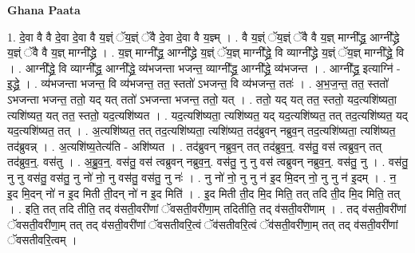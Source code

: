 \documentclass[17pt]{extarticle}
\begin{document}
\textbf{Ghana Paata } \newline

1. दे॒वा वै वै दे॒वा दे॒वा वै य॒ज्ञ्ं ॅय॒ज्ञ्ं ॅवै दे॒वा दे॒वा वै य॒ज्ञ्म् । . वै य॒ज्ञ्ं ॅय॒ज्ञ्ं ॅवै वै य॒ज्ञ् माग्नी᳚द्ध्र॒ आग्नी᳚द्ध्रे य॒ज्ञ्ं ॅवै वै य॒ज्ञ् माग्नी᳚द्ध्रे । . य॒ज्ञ् माग्नी᳚द्ध्र॒ आग्नी᳚द्ध्रे य॒ज्ञ्ं ॅय॒ज्ञ् माग्नी᳚द्ध्रे॒ वि व्याग्नी᳚द्ध्रे य॒ज्ञ्ं ॅय॒ज्ञ् माग्नी᳚द्ध्रे॒ वि । . आग्नी᳚द्ध्रे॒ वि व्याग्नी᳚द्ध्र॒ आग्नी᳚द्ध्रे॒ व्य॑भजन्ता भजन्त॒ व्याग्नी᳚द्ध्र॒ आग्नी᳚द्ध्रे॒ व्य॑भजन्त । . आग्नी᳚द्ध्र॒ इत्याग्नि॑ - इ॒द्ध्रे॒ । . व्य॑भजन्ता भजन्त॒ वि व्य॑भजन्त॒ तत॒ स्ततो॑ ऽभजन्त॒ वि व्य॑भजन्त॒ ततः॑ । . अ॒भ॒ज॒न्त॒ तत॒ स्ततो॑ ऽभजन्ता भजन्त॒ ततो॒ यद् यत् ततो॑ ऽभजन्ता भजन्त॒ ततो॒ यत् । . ततो॒ यद् यत् तत॒ स्ततो॒ यद॒त्यशि॑ष्यता॒ त्यशि॑ष्यत॒ यत् तत॒ स्ततो॒ यद॒त्यशि॑ष्यत । . यद॒त्यशि॑ष्यता॒ त्यशि॑ष्यत॒ यद् यद॒त्यशि॑ष्यत॒ तत् तद॒त्यशि॑ष्यत॒ यद् यद॒त्यशि॑ष्यत॒ तत् । . अ॒त्यशि॑ष्यत॒ तत् तद॒त्यशि॑ष्यता॒ त्यशि॑ष्यत॒ तद॑ब्रुवन् नब्रुव॒न् तद॒त्यशि॑ष्यता॒ त्यशि॑ष्यत॒ तद॑ब्रुवन्न् । . अ॒त्यशि॑ष्य॒तेत्य॑ति - अशि॑ष्यत । . तद॑ब्रुवन् नब्रुव॒न् तत् तद॑ब्रुव॒न्॒. वस॑तु॒ वस॑ त्वब्रुव॒न् तत् तद॑ब्रुव॒न्॒. वस॑तु । . अ॒ब्रु॒व॒न्॒. वस॑तु॒ वस॑ त्वब्रुवन् नब्रुव॒न्॒. वस॑तु॒ नु नु वस॑ त्वब्रुवन् नब्रुव॒न्॒. वस॑तु॒ नु । . वस॑तु॒ नु नु वस॑तु॒ वस॑तु॒ नु नो॑ नो॒ नु वस॑तु॒ वस॑तु॒ नु नः॑ । . नु नो॑ नो॒ नु नु न॑ इ॒द मि॒दन् नो॒ नु नु न॑ इ॒दम् । . न॒ इ॒द मि॒दन् नो॑ न इ॒द मिती ती॒दन् नो॑ न इ॒द मिति॑ । . इ॒द मिती ती॒द मि॒द मिति॒ तत् तदि ती॒द मि॒द मिति॒ तत् । . इति॒ तत् तदि तीति॒ तद् व॑सती॒वरी॑णां ॅवसती॒वरी॑णा॒म् तदितीति॒ तद् व॑सती॒वरी॑णाम् । . तद् व॑सती॒वरी॑णां ॅवसती॒वरी॑णा॒म् तत् तद् व॑सती॒वरी॑णां ॅवसतीवरि॒त्वं ॅव॑सतीवरि॒त्वं ॅव॑सती॒वरी॑णा॒म् तत् तद् व॑सती॒वरी॑णां ॅवसतीवरि॒त्वम् । \newline
\end{document}
